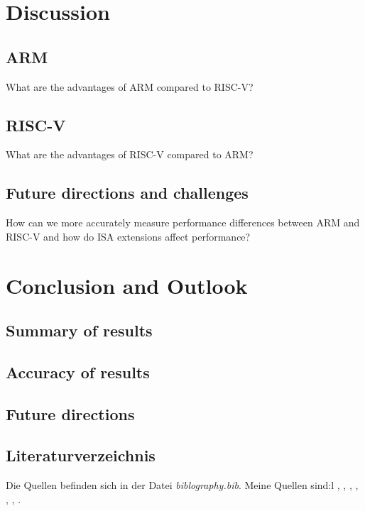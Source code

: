 \documentclass[conference]{IEEEtran}
\begin{document}
\section{Discussion}
\label{ref:discussion}
	\subsection{ARM}
	What are the advantages of ARM compared to RISC-V?
	\subsection{RISC-V}
	What are the advantages of RISC-V compared to ARM?
	\subsection{Future directions and challenges}
	How can we more accurately measure performance differences between ARM and RISC-V and how do ISA extensions affect performance?

\section{Conclusion and Outlook}
\label{ref:conclusion}
	\subsection{Summary of results}
	\subsection{Accuracy of results}
	\subsection{Future directions}

\subsection{Literaturverzeichnis}
Die Quellen befinden sich in der Datei \textit{biblography.bib}. 
Meine Quellen sind:l \cite{50years}, \cite{ArmManual}, \cite{hennessy2012computer}, \cite{WisconsinMadison2016} \cite{drechsler2020enhanced}, \cite{Asanovic2016}, \cite{IEEE2018} \cite{Dirvin2019}, \cite{Bandic2019}.



\end{document}
